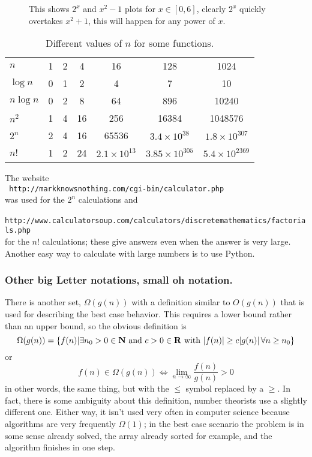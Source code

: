 \documentclass[11pt,a4paper]{scrartcl}
\begin{document}
\begin{figure}

\caption{This shows $2^x$ and $x^2-1$ plots for $x\in[0,6]$, clearly $2^x$ quickly overtakes $x^2+1$, this will happen for any power of $x$. \label{fig_exp}}
\end{figure}

\begin{table}
\begin{tabular}{l|cccccc}
        $n$    &1   &2&4   &16  &128&1024\\
$\log{n}$      &0   &1&2   &4   &7  &10\\
$n\log{n}$     &0   &2&8   &64  &896&10240\\
$n^2$     &1   &4&16&256&16384&1048576\\
$2^n$     &2   &4&16&65536&$3.4\times 10^{38}$&$1.8\times 10^{307}$\\
$n!$      &1   &2&24&$2.1\times 10^{13}$&$3.85\times 10^{305}$&$5.4\times10^{2369}$
\end{tabular}
\vskip 1cm The website\\ {\tt
  http://markknowsnothing.com/cgi-bin/calculator.php}\\ was used for
the $2^n$ calculations and\\ {\tt
  http://www.calculatorsoup.com/calculators/discretemathematics/factorials.php}\\ for
the $n!$ calculations; these give answers even when the answer is very
large. Another easy way to calculate with large numbers is to use Python.

\caption{Different values of $n$ for some functions.  \label{table_n_values}
}
\end{table}

\subsubsection*{Other big Letter notations, small oh notation.}

There is another set, $\Omega(g(n))$ with a definition similar to
$O(g(n))$ that is used for describing the best case behavior. This
requires a lower bound rather than an upper bound, so the obvious
definition is
\begin{equation}
\Omega(g(n))=\{f(n)| \exists n_0>0\in {\bf N}\mbox{ and }c>0\in {\bf R}\mbox{ with }|f(n)|\ge c|g(n)|\,\forall n\ge n_0\}
\end{equation}
or
\begin{equation}
f(n)\in \Omega(g(n))\iff \lim_{n\rightarrow \infty}\frac{f(n)}{g(n)}>0
\end{equation}
in other words, the same thing, but with the $\le$ symbol replaced by
a $\ge$. In fact, there is some ambiguity about this definition,
number theorists use a slightly different one. Either way, it isn't
used very often in computer science because algorithms are very
frequently $\Omega(1)$; in the best case scenario the problem is in
some sense already solved, the array already sorted for example, and
the algorithm finishes in one step. 
\end{document}
